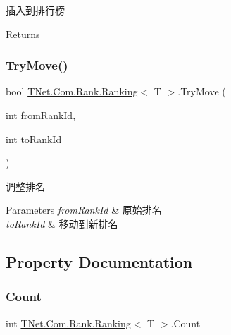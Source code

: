插入到排行榜 

\begin{DoxyReturn}{Returns}

\end{DoxyReturn}
\mbox{\label{class_t_net_1_1_com_1_1_rank_1_1_ranking_ad341394025d00b4392735c940300967b}} 
\subsubsection{\texorpdfstring{Try\+Move()}{TryMove()}}
{\footnotesize\ttfamily bool \mbox{\hyperlink{class_t_net_1_1_com_1_1_rank_1_1_ranking}{T\+Net.\+Com.\+Rank.\+Ranking}}$<$ T $>$.Try\+Move (\begin{DoxyParamCaption}\item[{int}]{from\+Rank\+Id,  }\item[{int}]{to\+Rank\+Id }\end{DoxyParamCaption})}



调整排名 


\begin{DoxyParams}{Parameters}
{\em from\+Rank\+Id} & 原始排名\\
\hline
{\em to\+Rank\+Id} & 移动到新排名\\
\hline
\end{DoxyParams}


\subsection{Property Documentation}
\mbox{\label{class_t_net_1_1_com_1_1_rank_1_1_ranking_af43d1404d153d185cdd4329ea511c31f}} 
\subsubsection{\texorpdfstring{Count}{Count}}
{\footnotesize\ttfamily int \mbox{\hyperlink{class_t_net_1_1_com_1_1_rank_1_1_ranking}{T\+Net.\+Com.\+Rank.\+Ranking}}$<$ T $>$.Count\hspace{0.3cm}{\ttfamily [get]}}





